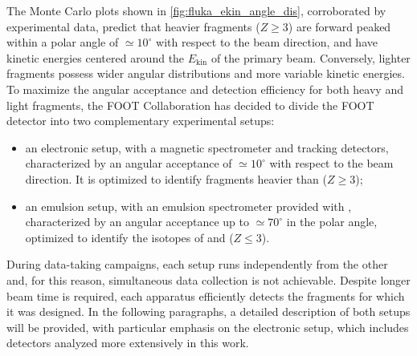 The Monte Carlo plots shown in \autoref{fig:fluka_ekin_angle_dis}, corroborated by experimental data, predict that heavier fragments ($Z\geq3$) are forward peaked within a polar angle of $\simeq10^{\circ}$ with respect to the beam direction, and have kinetic energies centered around the $E_\text{kin}$ of the primary beam. Conversely, lighter fragments possess wider angular distributions and more variable kinetic energies. To maximize the angular acceptance and detection efficiency for both heavy and light fragments, the FOOT Collaboration has decided to divide the FOOT detector into two complementary experimental setups:
\begin{itemize}
	\item an electronic setup, with a magnetic spectrometer and tracking detectors, characterized by an angular acceptance of $\simeq10^{\circ}$ with respect to the beam direction. It is optimized to identify fragments heavier than  ($Z\geq3$);
	\item an emulsion setup, with an emulsion spectrometer provided with , characterized by an angular acceptance up to $\simeq70^{\circ}$ in the polar angle, optimized to identify the isotopes of  and  ($Z\leq3$).
\end{itemize}
During data-taking campaigns, each setup runs independently from the other and, for this reason, simultaneous data collection is not achievable. Despite longer beam time is required, each apparatus efficiently detects the fragments for which it was designed. In the following paragraphs, a detailed description of both setups will be provided, with particular emphasis on the electronic setup, which includes detectors analyzed more extensively in this work.
